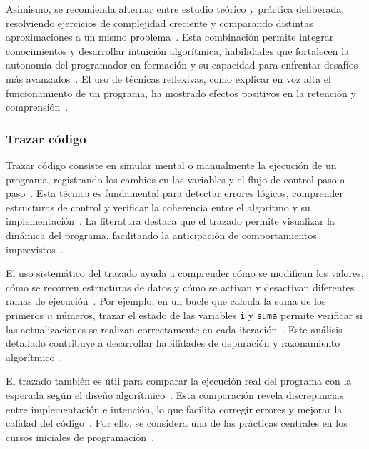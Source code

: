 \documentclass[12pt,twoside]{book}
\begin{document}
					Asimismo, se recomienda alternar entre estudio teórico y práctica deliberada, resolviendo ejercicios de complejidad creciente y comparando distintas aproximaciones a un mismo problema~\cite{Stallings2021Computer}. Esta combinación permite integrar conocimientos y desarrollar intuición algorítmica, habilidades que fortalecen la autonomía del programador en formación y su capacidad para enfrentar desafíos más avanzados~\cite{Sommerville2015Software}. El uso de técnicas reflexivas, como explicar en voz alta el funcionamiento de un programa, ha mostrado efectos positivos en la retención y comprensión~\cite{Gaddis2022Starting}.
					
					\subsubsection{Trazar código}
						Trazar código consiste en simular mental o manualmente la ejecución de un programa, registrando los cambios en las variables y el flujo de control paso a paso~\cite{Gaddis2022Starting}. Esta técnica es fundamental para detectar errores lógicos, comprender estructuras de control y verificar la coherencia entre el algoritmo y su implementación~\cite{Sommerville2015Software}. La literatura destaca que el trazado permite visualizar la dinámica del programa, facilitando la anticipación de comportamientos imprevistos~\cite{Pressman2019Software}.
						
						El uso sistemático del trazado ayuda a comprender cómo se modifican los valores, cómo se recorren estructuras de datos y cómo se activan y desactivan diferentes ramas de ejecución~\cite{Stallings2021Computer}. Por ejemplo, en un bucle que calcula la suma de los primeros \(n\) números, trazar el estado de las variables \texttt{i} y \texttt{suma} permite verificar si las actualizaciones se realizan correctamente en cada iteración~\cite{Gaddis2022Starting}. Este análisis detallado contribuye a desarrollar habilidades de depuración y razonamiento algorítmico~\cite{Sommerville2015Software}.
						
						El trazado también es útil para comparar la ejecución real del programa con la esperada según el diseño algorítmico~\cite{Pressman2019Software}. Esta comparación revela discrepancias entre implementación e intención, lo que facilita corregir errores y mejorar la calidad del código~\cite{Stallings2021Computer}. Por ello, se considera una de las prácticas centrales en los cursos iniciales de programación~\cite{Gaddis2022Starting}.
						
\end{document}
